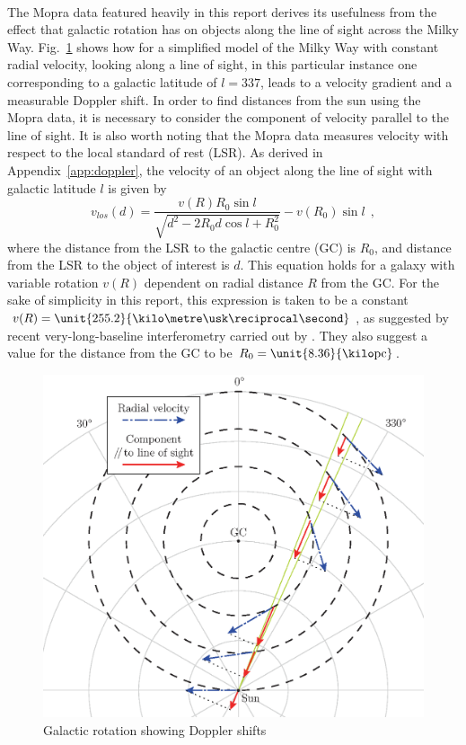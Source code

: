 \documentclass[a4paper, titlepage, oneside]{article}
\newcommand{\parsec}{\mathrm{pc}}
\begin{document}
\begin{multicols}{2}
\paragraph{}
The Mopra data featured heavily in this report \parencite{Burton:2013} derives its usefulness from the effect that galactic rotation has on objects along the line of sight across the Milky Way. Fig.~\ref{fig:gal-rot} shows how for a simplified model of the Milky Way with constant radial velocity, looking along a line of sight, in this particular instance one corresponding to a galactic latitude of \(l=337\), leads to a velocity gradient and a measurable Doppler shift. In order to find distances from the sun using the Mopra data, it is necessary to consider the component of velocity parallel to the line of sight. It is also worth noting that the Mopra data measures velocity with respect to the local standard of rest (LSR). As derived in Appendix~\ref{app:doppler}, the velocity of an object along the line of sight with galactic latitude \(l\) is given by
\begin{equation}
  v_{los}(d)=\frac{v(R)R_0\sin{l}}{\sqrt{d^2-2R_0d\cos{l}+R_0^2}}-v(R_0)\sin{l}\;\,,
\end{equation}
where the distance from the LSR to the galactic centre (GC) is \(R_0\), and distance from the LSR to the object of interest is \(d\). This equation holds for a galaxy with variable rotation \(v(R)\) dependent on radial distance \(R\) from the GC. For the sake of simplicity in this report, this expression is taken to be a constant \(v(R)=\unit{255.2}{\kilo\metre\usk\reciprocal\second}\), as suggested by recent very-long-baseline interferometry carried out by \textcite{Reid:2014}. They also suggest a value for the distance from the GC to be \(R_0=\unit{8.36}{\kilo\parsec}\).

\begin{figure}[H]
  \centering
  \includegraphics[width = \columnwidth]{figures/galactic-rotation}
  \caption{Galactic rotation showing Doppler shifts}
  \label{fig:gal-rot}
\end{figure}


\end{multicols}
\end{document}
